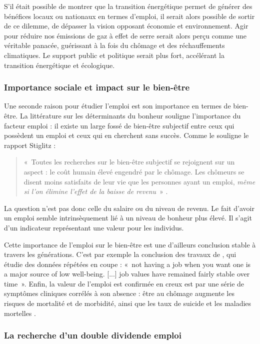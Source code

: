S’il était possible de montrer que la transition énergétique permet de générer des bénéfices locaux ou nationaux en termes d'emploi, il serait alors possible de sortir de ce dilemme, de dépasser la vision opposant économie et environnement. Agir pour réduire nos émissions de gaz à effet de serre serait alors perçu comme une véritable panacée, guérissant à la fois du chômage et des réchauffements climatiques. Le support public et politique serait plus fort, accélérant la transition énergétique et écologique.

\subsubsection{Importance sociale et impact sur le bien-être}

Une seconde raison pour étudier l'emploi est son importance en termes de bien-être.
La littérature sur les déterminants du bonheur souligne l’importance du facteur emploi : il existe un large fossé de bien-être subjectif entre ceux qui possèdent un emploi et ceux qui en cherchent sans succès. Comme le souligne le rapport Stiglitz : 
\begin{quote}
	«~Toutes les recherches sur le bien-être subjectif se rejoignent sur un aspect : le coût humain élevé engendré par le chômage. Les chômeurs se disent moins satisfaits de leur vie que les personnes ayant un emploi, \textit{même si l'on élimine l'effet de la baisse de revenu}~» \citep[p. 166, l'emphase est de mon fait]{Stiglitz2009}.
\end{quote}			
La question n'est pas donc celle du salaire ou du niveau de revenu. Le fait d'avoir un emploi semble intrinsèquement lié à un niveau de bonheur plus élevé. Il s'agit d'un indicateur représentant une valeur pour les individus.

Cette importance de l’emploi sur le bien-être est une d'ailleurs conclusion stable à travers les générations. C'est par exemple la conclusion des travaux de \citet{Clark2009}, qui étudie des données répétées en coupe :
«~not having a job when you want one is a major source of low well-being. [...] job values have remained fairly stable over time~». Enfin, la valeur de l'emploi est confirmée en creux est par une série de symptômes cliniques corrélés à son absence : être au chômage augmente les risques de mortalité et de morbidité, ainsi que les taux de suicide et les maladies mortelles \citep{Gerdtham2003}.


\subsubsection{La recherche d'un double dividende emploi}

